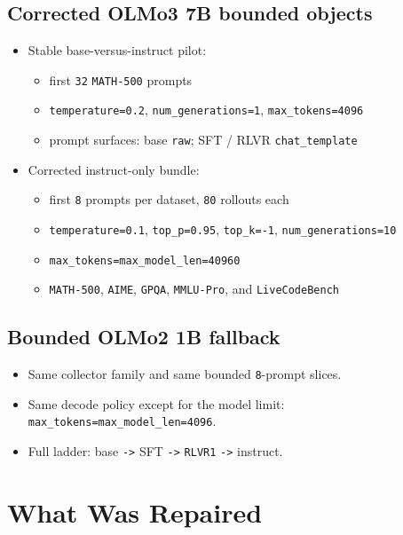 \documentclass[11pt]{article}
\begin{document}
\subsection*{Corrected OLMo3 7B bounded objects}
\begin{itemize}[leftmargin=1.5em]
\item Stable base-versus-instruct pilot:
  \begin{itemize}[leftmargin=1.5em]
  \item first \texttt{32} \texttt{MATH-500} prompts
  \item \texttt{temperature=0.2}, \texttt{num\_generations=1}, \texttt{max\_tokens=4096}
  \item prompt surfaces: base \texttt{raw}; SFT / RLVR \texttt{chat\_template}
  \end{itemize}
\item Corrected instruct-only bundle:
  \begin{itemize}[leftmargin=1.5em]
  \item first \texttt{8} prompts per dataset, \texttt{80} rollouts each
  \item \texttt{temperature=0.1}, \texttt{top\_p=0.95}, \texttt{top\_k=-1}, \texttt{num\_generations=10}
  \item \texttt{max\_tokens=max\_model\_len=40960}
  \item \texttt{MATH-500}, \texttt{AIME}, \texttt{GPQA}, \texttt{MMLU-Pro}, and \texttt{LiveCodeBench}
  \end{itemize}
\end{itemize}

\subsection*{Bounded OLMo2 1B fallback}
\begin{itemize}[leftmargin=1.5em]
\item Same collector family and same bounded \texttt{8}-prompt slices.
\item Same decode policy except for the model limit: \texttt{max\_tokens=max\_model\_len=4096}.
\item Full ladder: base \texttt{->} SFT \texttt{->} \texttt{RLVR1} \texttt{->} instruct.
\end{itemize}

\section*{What Was Repaired}
\end{document}
